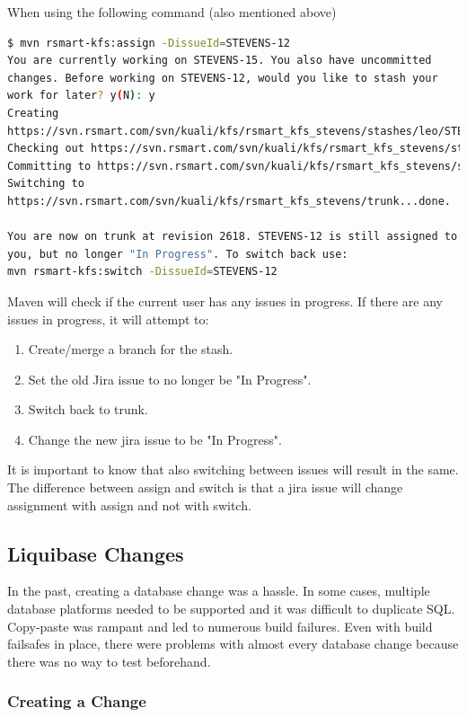 \documentclass[12pt,notitlepage]{article}
\begin{document}
When using the following command (also mentioned above)
\begin{lstlisting}[language=bash,caption={Assign the above issue to me}]
$ mvn rsmart-kfs:assign -DissueId=STEVENS-12
You are currently working on STEVENS-15. You also have uncommitted
changes. Before working on STEVENS-12, would you like to stash your
work for later? y(N): y
Creating
https://svn.rsmart.com/svn/kuali/kfs/rsmart_kfs_stevens/stashes/leo/STEVENS-12...done.
Checking out https://svn.rsmart.com/svn/kuali/kfs/rsmart_kfs_stevens/stashes/leo/STEVENS-12...done.
Committing to https://svn.rsmart.com/svn/kuali/kfs/rsmart_kfs_stevens/stashes/leo/STEVENS-12...done.
Switching to
https://svn.rsmart.com/svn/kuali/kfs/rsmart_kfs_stevens/trunk...done.

You are now on trunk at revision 2618. STEVENS-12 is still assigned to
you, but no longer "In Progress". To switch back use:
mvn rsmart-kfs:switch -DissueId=STEVENS-12
\end{lstlisting}

Maven will check if the current user has any issues in progress. If
there are any issues in progress, it will attempt to:
\begin{enumerate}
\item Create/merge a branch for the stash. 
\item Set the old Jira issue to no longer be "In Progress".
\item Switch back to trunk.
\item Change the new jira issue to be "In Progress".
\end{enumerate}

It is important to know that also switching between issues will result
in the same. The difference between assign and switch is that a jira
issue will change assignment with assign and not with switch.

\subsection{Liquibase Changes}
In the past, creating a database change was a hassle. In some cases,
multiple database platforms needed to be supported and it was
difficult to duplicate SQL. Copy-paste was rampant and led to numerous
build failures. Even with build failsafes in place, there were
problems with almost every database change because there was no way to
test beforehand.

\subsubsection{Creating a Change}
\end{document}
